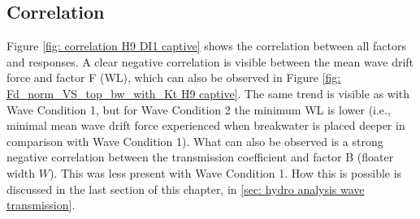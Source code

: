 \subsection{Correlation}
\label{sec: H9 captive correlation}

Figure \ref{fig: correlation H9 DI1 captive} shows the correlation between all factors and responses. A clear negative correlation is visible between the mean wave drift force and factor F (WL), which can also be observed in Figure \ref{fig: Fd_norm_VS_top_bw_with_Kt H9 captive}. The same trend is visible as with Wave Condition 1, but for Wave Condition 2 the minimum WL is lower (i.e., minimal mean wave drift force experienced when breakwater is placed deeper in comparison with Wave Condition 1).  What can also be observed is a strong negative correlation between the transmission coefficient and factor B (floater width $W$). This was less present with Wave Condition 1. How this is possible is discussed in the last section of this chapter, in \ref{sec: hydro analysis wave transmission}.

